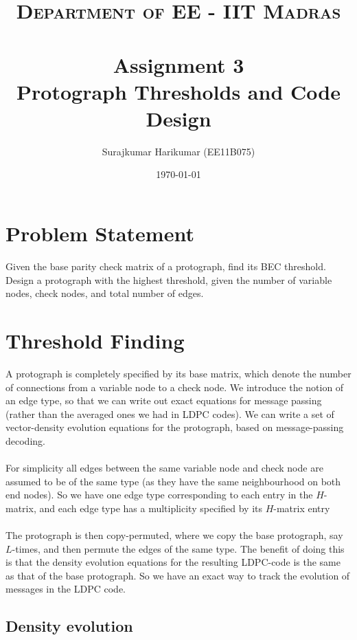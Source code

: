 \documentclass[paper=a4, fontsize=12pt]{scrartcl} %
\title{	
\normalfont \normalsize 
\textsc{Department of EE - IIT Madras} \\ [25pt] %
\horrule{0.5pt} \\[0.4cm] %
\huge Assignment 3 \\Protograph Thresholds and Code Design %
\horrule{2pt} \\[0.5cm] %
}
\author{Surajkumar Harikumar (EE11B075)} %
\date{\normalsize\today} %
\numberwithin{equation}{section} %
\numberwithin{figure}{section} %
\numberwithin{table}{section} %
\begin{document}
\maketitle %


\section{Problem Statement}

Given the base parity check matrix of a protograph, find its BEC threshold. Design a protograph with the highest threshold, given the number of variable nodes, check nodes, and total number of edges. 

\section{Threshold Finding}

A protograph is completely specified by its base matrix, which denote the number of connections from a variable node to a check node.  We introduce the notion of an edge type, so that we can write out exact equations for message passing (rather than the averaged ones we had in LDPC codes). We can write a set of vector-density evolution equations for the protograph, based on message-passing decoding.
\\ \\
For simplicity all edges between the same variable node and check node are assumed to be of the same type (as they have the same neighbourhood on both end nodes). So we have one edge type corresponding to each entry in the $H$-matrix, and each edge type has a multiplicity specified by its $H$-matrix entry
\\ \\
The protograph is then copy-permuted, where we copy the base protograph, say $L$-times, and then permute the edges of the same type. The benefit of doing this is that the density evolution equations for the resulting LDPC-code is the same as that of the base protograph. So we have an exact way to track the evolution of messages in the LDPC code. 

\pagebreak
\subsection{Density evolution}
\end{document}
